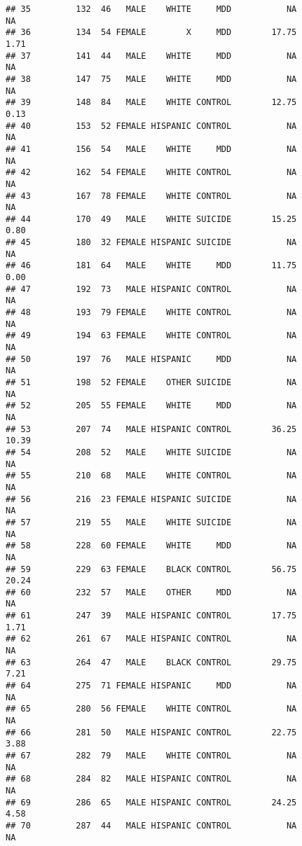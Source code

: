 \documentclass[]{article}
\begin{document}
\begin{verbatim}
## 35         132  46   MALE    WHITE     MDD           NA            NA
## 36         134  54 FEMALE        X     MDD        17.75          1.71
## 37         141  44   MALE    WHITE     MDD           NA            NA
## 38         147  75   MALE    WHITE     MDD           NA            NA
## 39         148  84   MALE    WHITE CONTROL        12.75          0.13
## 40         153  52 FEMALE HISPANIC CONTROL           NA            NA
## 41         156  54   MALE    WHITE     MDD           NA            NA
## 42         162  54 FEMALE    WHITE CONTROL           NA            NA
## 43         167  78 FEMALE    WHITE CONTROL           NA            NA
## 44         170  49   MALE    WHITE SUICIDE        15.25          0.80
## 45         180  32 FEMALE HISPANIC SUICIDE           NA            NA
## 46         181  64   MALE    WHITE     MDD        11.75          0.00
## 47         192  73   MALE HISPANIC CONTROL           NA            NA
## 48         193  79 FEMALE    WHITE CONTROL           NA            NA
## 49         194  63 FEMALE    WHITE CONTROL           NA            NA
## 50         197  76   MALE HISPANIC     MDD           NA            NA
## 51         198  52 FEMALE    OTHER SUICIDE           NA            NA
## 52         205  55 FEMALE    WHITE     MDD           NA            NA
## 53         207  74   MALE HISPANIC CONTROL        36.25         10.39
## 54         208  52   MALE    WHITE SUICIDE           NA            NA
## 55         210  68   MALE    WHITE CONTROL           NA            NA
## 56         216  23 FEMALE HISPANIC SUICIDE           NA            NA
## 57         219  55   MALE    WHITE SUICIDE           NA            NA
## 58         228  60 FEMALE    WHITE     MDD           NA            NA
## 59         229  63 FEMALE    BLACK CONTROL        56.75         20.24
## 60         232  57   MALE    OTHER     MDD           NA            NA
## 61         247  39   MALE HISPANIC CONTROL        17.75          1.71
## 62         261  67   MALE HISPANIC CONTROL           NA            NA
## 63         264  47   MALE    BLACK CONTROL        29.75          7.21
## 64         275  71 FEMALE HISPANIC     MDD           NA            NA
## 65         280  56 FEMALE    WHITE CONTROL           NA            NA
## 66         281  50   MALE HISPANIC CONTROL        22.75          3.88
## 67         282  79   MALE    WHITE CONTROL           NA            NA
## 68         284  82   MALE HISPANIC CONTROL           NA            NA
## 69         286  65   MALE HISPANIC CONTROL        24.25          4.58
## 70         287  44   MALE HISPANIC CONTROL           NA            NA

\end{verbatim}
\end{document}
